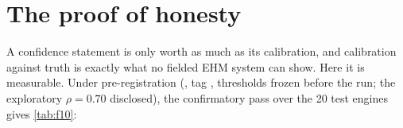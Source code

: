 \section{The proof of honesty}
\label{sec:bt-honesty}

A confidence statement is only worth as much as its calibration, and calibration against
truth is exactly what no fielded EHM system can show. Here it is measurable. Under
pre-registration (, tag , thresholds frozen before
the run; the exploratory $\rho=0.70$ disclosed), the confirmatory pass over the 20 test
engines gives \cref{tab:f10}:

\begin{table}[htbp]
  \centering\small
  \caption{F10 pre-registered verdicts (single confirmatory pass). Auto-generated.}
  \label{tab:f10}
  
\end{table}


